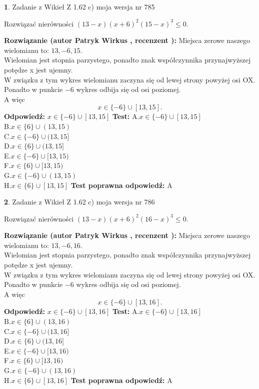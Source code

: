 \documentclass[12pt, a4paper]{article}
\theoremstyle{definition} %
\newtheorem{zad}{}
\newcommand{\zadStart}[1]{\begin{zad}#1\newline}
\newcommand{\zadStop}{\end{zad}}
\newcommand{\rozwStart}[2]{\noindent \textbf{Rozwiązanie (autor #1 , recenzent #2): }\newline}
\newcommand{\rozwStop}{\newline}
\newcommand{\odpStart}{\noindent \textbf{Odpowiedź:}\newline}
\newcommand{\odpStop}{\newline}
\newcommand{\testStart}{\noindent \textbf{Test:}\newline}
\newcommand{\testStop}{\newline}
\newcommand{\kluczStart}{\noindent \textbf{Test poprawna odpowiedź:}\newline}
\newcommand{\kluczStop}{\newline}
\begin{document}
\zadStart{Zadanie z Wikieł Z 1.62 c) moja wersja nr 785}

Rozwiązać nierówności $(13-x)(x+6)^{2}(15-x)^{3}\le0$.
\zadStop
\rozwStart{Patryk Wirkus}{}
Miejsca zerowe naszego wielomianu to: $13, -6, 15$.\\
Wielomian jest stopnia parzystego, ponadto znak współczynnika przy\linebreak najwyższej potędze x jest ujemny.\\ W związku z tym wykres wielomianu zaczyna się od lewej strony powyżej osi OX.\\
Ponadto w punkcie $-6$ wykres odbija się od osi poziomej.\\
A więc $$x \in \{-6\} \cup [13,15].$$
\rozwStop
\odpStart
$x \in \{-6\} \cup [13,15]$
\odpStop
\testStart
A.$x \in \{-6\} \cup [13,15]$\\
B.$x \in \{6\} \cup (13,15)$\\
C.$x \in \{-6\} \cup (13,15]$\\
D.$x \in \{6\} \cup (13,15]$\\
E.$x \in \{-6\} \cup [13,15)$\\
F.$x \in \{6\} \cup [13,15)$\\
G.$x \in \{-6\} \cup (13,15)$\\
H.$x \in \{6\} \cup [13,15]$
\testStop
\kluczStart
A
\kluczStop



\zadStart{Zadanie z Wikieł Z 1.62 c) moja wersja nr 786}

Rozwiązać nierówności $(13-x)(x+6)^{2}(16-x)^{3}\le0$.
\zadStop
\rozwStart{Patryk Wirkus}{}
Miejsca zerowe naszego wielomianu to: $13, -6, 16$.\\
Wielomian jest stopnia parzystego, ponadto znak współczynnika przy\linebreak najwyższej potędze x jest ujemny.\\ W związku z tym wykres wielomianu zaczyna się od lewej strony powyżej osi OX.\\
Ponadto w punkcie $-6$ wykres odbija się od osi poziomej.\\
A więc $$x \in \{-6\} \cup [13,16].$$
\rozwStop
\odpStart
$x \in \{-6\} \cup [13,16]$
\odpStop
\testStart
A.$x \in \{-6\} \cup [13,16]$\\
B.$x \in \{6\} \cup (13,16)$\\
C.$x \in \{-6\} \cup (13,16]$\\
D.$x \in \{6\} \cup (13,16]$\\
E.$x \in \{-6\} \cup [13,16)$\\
F.$x \in \{6\} \cup [13,16)$\\
G.$x \in \{-6\} \cup (13,16)$\\
H.$x \in \{6\} \cup [13,16]$
\testStop
\kluczStart
A
\kluczStop
\end{document}

